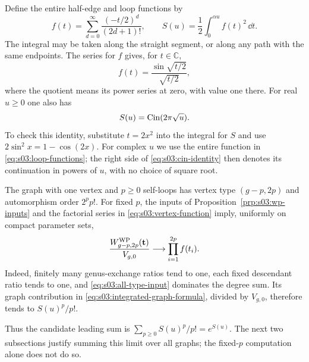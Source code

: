 Define the entire half-edge and loop functions by
\begin{equation}
\label{eq:s03:loop-functions}
f(t)=\sum_{d=0}^{\infty}\frac{(-t/2)^d}{(2d+1)!},
\qquad
S(u)=\frac12\int_0^{\alpha u}f(t)^2\,\dd t.
\end{equation}
The integral may be taken along the straight segment, or along any path
with the same endpoints. The series for $f$ gives, for $t\in\mathbb C$,
\begin{equation}
\label{eq:s03:sine-function}
f(t)=\frac{\sin\sqrt{t/2}}{\sqrt{t/2}},
\end{equation}
where the quotient means its power series at zero, with value one there.
For real $u\geq0$ one also has
\begin{equation}
\label{eq:s03:cin-identity}
S(u)=\operatorname{\mathrm{Cin}}(2\pi\sqrt u).
\end{equation}
To check this identity, substitute $t=2x^2$ into the
integral for $S$ and use $2\sin^2x=1-\cos(2x)$. For complex $u$ we use
the entire function in \eqref{eq:s03:loop-functions}; the right side of
\eqref{eq:s03:cin-identity} then denotes its continuation in powers of
$u$, with no choice of square root.

\begin{exm}
The graph with one vertex and $p\geq0$ self-loops has vertex type
$(g-p,2p)$ and automorphism order $2^p p!$. For fixed $p$, the inputs
of Proposition~\ref{prp:s03:wp-inputs} and the factorial series in
\eqref{eq:s03:vertex-function} imply, uniformly on compact parameter
sets,
\[
\frac{W^{\rm WP}_{g-p,2p}(\mathbf t)}{V_{g,0}}
\longrightarrow\prod_{i=1}^{2p}f(t_i).
\]
Indeed, finitely many genus-exchange ratios tend to one, each fixed
descendant ratio tends to one, and
\eqref{eq:s03:all-type-input} dominates the degree sum.
Its graph contribution in \eqref{eq:s03:integrated-graph-formula},
divided by $V_{g,0}$, therefore tends to $S(u)^p/p!$.

Thus the candidate leading sum is $\sum_{p\geq0}S(u)^p/p!=e^{S(u)}$.
The next two subsections justify summing this limit over all graphs;
the fixed-$p$ computation alone does not do so.
\end{exm}
